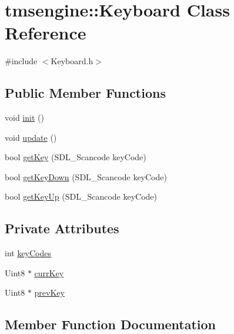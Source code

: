 \hypertarget{classtmsengine_1_1_keyboard}{}\section{tmsengine\+:\+:Keyboard Class Reference}
\label{classtmsengine_1_1_keyboard}


{\ttfamily \#include $<$Keyboard.\+h$>$}

\subsection*{Public Member Functions}
\begin{DoxyCompactItemize}
\item 
void \hyperlink{classtmsengine_1_1_keyboard_a4f06c5af1c66b1068eb588fffa90aea2}{init} ()
\item 
void \hyperlink{classtmsengine_1_1_keyboard_a61b823821007a6583b277cf0622b201f}{update} ()
\item 
bool \hyperlink{classtmsengine_1_1_keyboard_ab7baeae12cffe8f588fdf5a1227f09ba}{get\+Key} (S\+D\+L\+\_\+\+Scancode key\+Code)
\item 
bool \hyperlink{classtmsengine_1_1_keyboard_a41ea249e18f2422a1de274dd51df0e8c}{get\+Key\+Down} (S\+D\+L\+\_\+\+Scancode key\+Code)
\item 
bool \hyperlink{classtmsengine_1_1_keyboard_a9de47cf02ce1c2c7c1652ac94ea19f5b}{get\+Key\+Up} (S\+D\+L\+\_\+\+Scancode key\+Code)
\end{DoxyCompactItemize}
\subsection*{Private Attributes}
\begin{DoxyCompactItemize}
\item 
int \hyperlink{classtmsengine_1_1_keyboard_ab5325c0c186bdb26b7768e394b0c155a}{key\+Codes}
\item 
Uint8 $\ast$ \hyperlink{classtmsengine_1_1_keyboard_ab35375d64c025c56b604e923e0287ea9}{curr\+Key}
\item 
Uint8 $\ast$ \hyperlink{classtmsengine_1_1_keyboard_a18f801428d84502e6df1b669c0ca5cb4}{prev\+Key}
\end{DoxyCompactItemize}


\subsection{Member Function Documentation}
\mbox{\label{classtmsengine_1_1_keyboard_ab7baeae12cffe8f588fdf5a1227f09ba}} 
